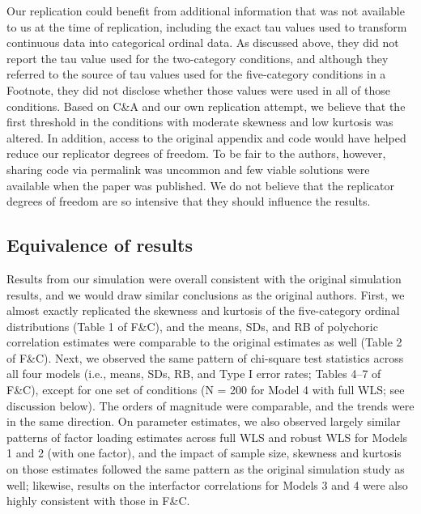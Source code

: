 \documentclass[10,a4paperpaper,]{article}
\begin{document}
Our replication could benefit from additional information that was not
available to us at the time of replication, including the exact tau
values used to transform continuous data into categorical ordinal data.
As discussed above, they did not report the tau value used for the
two-category conditions, and although they referred to the source of tau
values used for the five-category conditions in a Footnote, they did not
disclose whether those values were used in all of those conditions.
Based on C\&A and our own replication attempt, we believe that the first
threshold in the conditions with moderate skewness and low kurtosis was
altered. In addition, access to the original appendix and code would
have helped reduce our replicator degrees of freedom. To be fair to the
authors, however, sharing code via permalink was uncommon and few viable
solutions were available when the paper was published. We do not believe
that the replicator degrees of freedom are so intensive that they should
influence the results.

\subsection{Equivalence of results}

Results from our simulation were overall consistent with the original
simulation results, and we would draw similar conclusions as the
original authors. First, we almost exactly replicated the skewness and
kurtosis of the five-category ordinal distributions (Table 1 of F\&C),
and the means, SDs, and RB of polychoric correlation estimates were
comparable to the original estimates as well (Table 2 of F\&C). Next, we
observed the same pattern of chi-square test statistics across all four
models (i.e., means, SDs, RB, and Type I error rates; Tables 4--7 of
F\&C), except for one set of conditions (N = 200 for Model 4 with full
WLS; see discussion below). The orders of magnitude were comparable, and
the trends were in the same direction. On parameter estimates, we also
observed largely similar patterns of factor loading estimates across
full WLS and robust WLS for Models 1 and 2 (with one factor), and the
impact of sample size, skewness and kurtosis on those estimates followed
the same pattern as the original simulation study as well; likewise,
results on the interfactor correlations for Models 3 and 4 were also
highly consistent with those in F\&C.
\end{document}

